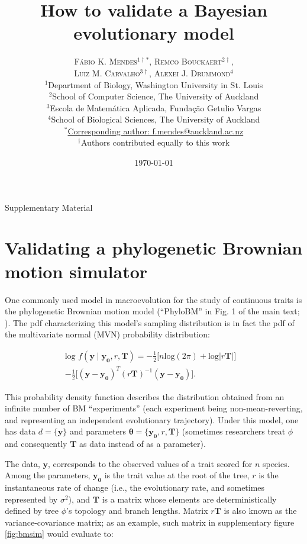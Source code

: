 \documentclass[oneside]{article}
\title{How to validate a Bayesian evolutionary model} %
\author{\textsc{F\'{a}bio K. Mendes$^{1\dagger*}$}, \textsc{Remco Bouckaert$^{2\dagger}$},\\
\textsc{Luiz M. Carvalho$^{3\dagger}$}, \textsc{Alexei J. Drummond$^{4}$} \\
\small $^1$Department of Biology, Washington University in St. Louis\\
\small $^2$School of Computer Science, The University of Auckland\\
\small $^3$Escola de Matem\'{a}tica Aplicada, Fundaç\~{a}o Getulio Vargas\\
\small $^4$School of Biological Sciences, The University of Auckland\\
\small
\href{mailto:f.mendes@auckland.ac.nz}{$^*$Corresponding author: f.mendes@auckland.ac.nz}\\
{\small $^\dagger$Authors contributed equally to this work}
}
\date{\today} %
\begin{document}
\maketitle

\begin{center}
    \Large Supplementary Material
\end{center}

\newpage

\section{Validating a phylogenetic Brownian motion simulator}

One commonly used model in macroevolution for the study of continuous traits is the phylogenetic Brownian motion model (``PhyloBM'' in Fig. 1 of the main text; \citealt{fel73}).
The pdf characterizing this model's sampling distribution is in fact the pdf of the multivariate normal (MVN) probability distribution:

\begin{equation}
  \begin{split}
    \text{log }f(\boldsymbol{y} \mid \boldsymbol{y_0}, r, \boldsymbol{T}) = -\frac{1}{2} \Big[ n\text{log}(2\pi) + \text{log}|r \boldsymbol{T}| \Big] & \\
    -\frac{1}{2} \Big[ (\mathbf{y} - \boldsymbol{y_0})^T (r \boldsymbol{T})^{-1} (\mathbf{y} - \boldsymbol{y_0}) \Big].
  \label{eq:bm}
  \end{split}
\end{equation}

\noindent This probability density function describes the distribution obtained from an infinite number of BM ``experiments'' (each experiment being non-mean-reverting, and representing an independent evolutionary trajectory).
Under this model, one has data $d = \{\boldsymbol{y}\}$ and parameters $\boldsymbol{\theta} = \{\boldsymbol{y_0}, r, \boldsymbol{T}\}$ (sometimes researchers treat $\phi$ and consequently $\boldsymbol{T}$ as data instead of as a parameter).

The data, $\boldsymbol{y}$, corresponds to the observed values of a trait scored for $n$ species.
Among the parameters, $\boldsymbol{y_0}$ is the trait value at the root of the tree, $r$ is the instantaneous rate of change (i.e., the evolutionary rate, and sometimes represented by $\sigma^2$), and $\boldsymbol{T}$ is a matrix whose elements are deterministically defined by tree $\phi$'s topology and branch lengths.
Matrix $r\boldsymbol{T}$ is also known as the variance-covariance matrix; as an example, such matrix in supplementary figure \ref{fig:bmsim} would evaluate to:
\end{document}
